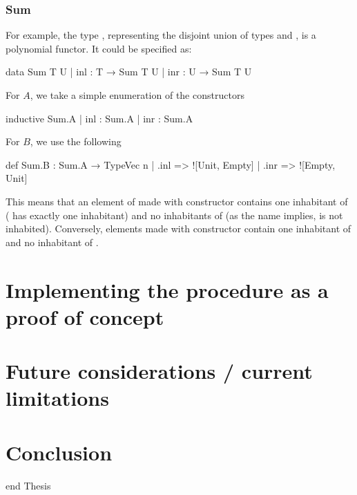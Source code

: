 \documentclass[titlepage]{report}
\newenvironment{leanhidden}{\expandafter\comment}{\expandafter\endcomment}
\begin{document}
\subsection*{Sum}
For example, the type , representing the disjoint union of types  and ,
is a polynomial functor. It could be specified as:
\begin{leancode}
    data Sum T U
    | inl : T → Sum T U
    | inr : U → Sum T U
\end{leancode}
For $A$, we take a simple enumeration of the constructors
\begin{leancode}
    inductive Sum.A
    | inl : Sum.A
    | inr : Sum.A
\end{leancode}
For $B$, we use the following
\begin{leancode}
    def Sum.B : Sum.A → TypeVec n
    | .inl => ![Unit, Empty]
    | .inr => ![Empty, Unit]
\end{leancode}
This means that an element of  made with constructor  contains one inhabitant of  ( has exactly one inhabitant) and no inhabitants of  (as the name implies,  is not inhabited). Conversely, elements made with constructor  contain one inhabitant of  and no inhabitant of .





















\chapter{Implementing the procedure as a proof of concept}
\label{ch:implementing}










\chapter{Future considerations / current limitations}
\label{ch:limitations}







\chapter{Conclusion}
\label{ch:conclusion}















\begin{leanhidden}
    end Thesis
\end{leanhidden}





\end{document}
